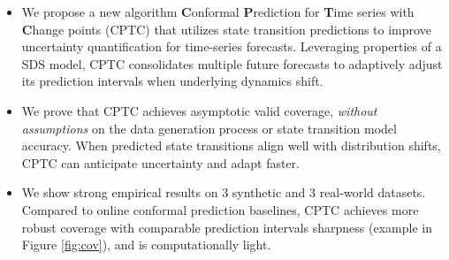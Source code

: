 %
\vspace{-0.5em}
\begin{itemize}
    \item We propose a new algorithm \textbf{C}onformal \textbf{P}rediction for \textbf{T}ime series with \textbf{C}hange points (CPTC) that utilizes state transition predictions to improve uncertainty quantification for time-series forecasts. Leveraging properties of a SDS model, CPTC consolidates multiple future forecasts to adaptively adjust its prediction intervals when underlying dynamics shift.
    \item We prove that CPTC achieves asymptotic valid coverage, \textit{without assumptions} on the data generation process or state transition model accuracy. When predicted state transitions align well with distribution shifts, CPTC can anticipate uncertainty and adapt faster.
    \item We show strong empirical results on 3 synthetic and 3 real-world datasets. Compared to online conformal prediction baselines, CPTC achieves more robust coverage with comparable prediction intervals sharpness (example in Figure \ref{fig:cov}), and is computationally light.%
\end{itemize}



